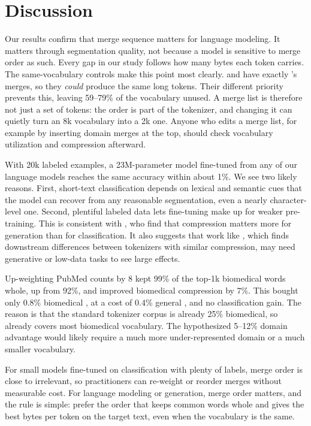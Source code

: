\section{Discussion}
\label{sec:discussion}

Our results confirm that merge sequence matters for language modeling.
It matters through segmentation quality, not because a model is sensitive to merge order as such.
Every \bpb gap in our study follows how many bytes each token carries.
The same-vocabulary controls make this point most clearly.
\randorder and \revorder have exactly \freq's merges, so they \emph{could} produce the same long tokens.
Their different priority prevents this, leaving 59--79\% of the vocabulary unused.
A merge list is therefore not just a set of tokens: the order is part of the tokenizer, and changing it can quietly turn an 8k vocabulary into a 2k one.
Anyone who edits a merge list, for example by inserting domain merges at the top, should check vocabulary utilization and compression afterward.

With 20k labeled examples, a 23M-parameter model fine-tuned from any of our language models reaches the same accuracy within about 1\%.
We see two likely reasons.
First, short-text classification depends on lexical and semantic cues that the model can recover from any reasonable segmentation, even a nearly character-level one.
Second, plentiful labeled data lets fine-tuning make up for weaker pre-training.
This is consistent with \citet{goldman2024unpacking}, who find that compression matters more for generation than for classification.
It also suggests that work like \citet{schmidt2024tokenization}, which finds downstream differences between tokenizers with similar compression, may need generative or low-data tasks to see large effects.

Up-weighting PubMed counts by 8 kept 99\% of the top-1k biomedical words whole, up from 92\%, and improved biomedical compression by 7\%.
This bought only 0.8\% biomedical \bpb, at a cost of 0.4\% general \bpb, and no classification gain.
The reason is that the standard tokenizer corpus is already 25\% biomedical, so \freq already covers most biomedical vocabulary.
The hypothesized 5--12\% domain advantage would likely require a much more under-represented domain or a much smaller vocabulary.

For small models fine-tuned on classification with plenty of labels, merge order is close to irrelevant, so practitioners can re-weight or reorder merges without measurable cost.
For language modeling or generation, merge order matters, and the rule is simple: prefer the order that keeps common words whole and gives the best bytes per token on the target text, even when the vocabulary is the same.

